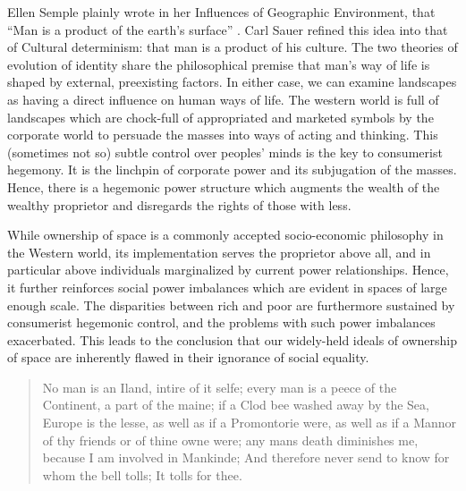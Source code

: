 \documentclass[12pt, letterpaper, oneside]{article}
\begin{document}
Ellen Semple plainly wrote in her Influences of Geographic Environment, that ``Man is a product of the earth's surface'' \autocite{semple1911influences}. Carl Sauer refined this idea into that of Cultural determinism: that man is a product of his culture. The two theories of evolution of identity share the philosophical premise that man's way of life is shaped by external, preexisting factors. In either case, we can examine landscapes as having a direct influence on human ways of life. The western world is full of landscapes which are chock-full of appropriated and marketed symbols by the corporate world to persuade the masses into ways of acting and thinking. This (sometimes not so) subtle control over peoples' minds is the key to consumerist hegemony. It is the linchpin of corporate power and its subjugation of the masses. Hence, there is a hegemonic power structure which augments the wealth of the wealthy proprietor and disregards the rights of those with less. 

While ownership of space is a commonly accepted socio-economic philosophy in the Western world, its implementation serves the proprietor above all, and in particular above individuals marginalized by current power relationships. Hence, it further reinforces social power imbalances which are evident in spaces of large enough scale. The disparities between rich and poor are furthermore sustained by consumerist hegemonic control, and the problems with such power imbalances exacerbated. This leads to the conclusion that our widely-held ideals of ownership of space are inherently flawed in their ignorance of social equality.


\begin{quote}
No man is an Iland, intire of it selfe; every man is a peece of the Continent, a part of the maine; if a Clod bee washed away by the Sea, Europe is the lesse, as well as if a Promontorie were, as well as if a Mannor of thy friends or of thine owne were; any mans death diminishes me, because I am involved in Mankinde; And therefore never send to know for whom the bell tolls; It tolls for thee.

\autocite{donne1975devotions}
\end{quote}

\clearpage
\printbibliography
\end{document}
